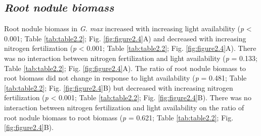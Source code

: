 \newpage
\subsection{\textit{Root nodule biomass}}
Root nodule biomass in \textit{G. max} increased with increasing light availability (\textit{p} < 0.001; Table \ref{tab:table2.2}; Fig. \ref{fig:figure2.4}A) and decreased with increasing nitrogen fertilization (\textit{p} < 0.001; Table \ref{tab:table2.2}; Fig. \ref{fig:figure2.4}A). There was no interaction between nitrogen fertilization and light availability (\textit{p} = 0.133; Table \ref{tab:table2.2}; Fig. \ref{fig:figure2.4}A). The ratio of root nodule biomass to root biomass did not change in response to light availability (\textit{p} = 0.481; Table \ref{tab:table2.2}; Fig. \ref{fig:figure2.4}B) but decreased with increasing nitrogen fertilization (\textit{p} < 0.001; Table \ref{tab:table2.2}; Fig. \ref{fig:figure2.4}B). There was no interaction between nitrogen fertilization and light availability on the ratio of root nodule biomass to root biomass (\textit{p} = 0.621; Table \ref{tab:table2.2}; Fig. \ref{fig:figure2.4}B).

